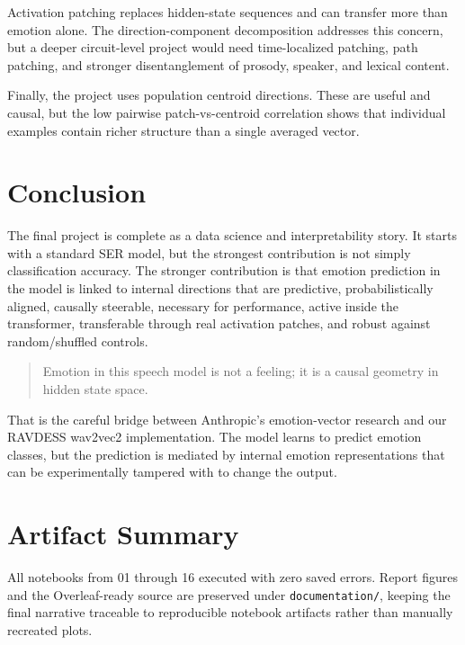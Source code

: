 \documentclass[conference]{IEEEtran}
\begin{document}
Activation patching replaces hidden-state sequences and can transfer more than emotion alone. The direction-component decomposition addresses this concern, but a deeper circuit-level project would need time-localized patching, path patching, and stronger disentanglement of prosody, speaker, and lexical content.

Finally, the project uses population centroid directions. These are useful and causal, but the low pairwise patch-vs-centroid correlation shows that individual examples contain richer structure than a single averaged vector.

\section{Conclusion}

The final project is complete as a data science and interpretability story. It starts with a standard SER model, but the strongest contribution is not simply classification accuracy. The stronger contribution is that emotion prediction in the model is linked to internal directions that are predictive, probabilistically aligned, causally steerable, necessary for performance, active inside the transformer, transferable through real activation patches, and robust against random/shuffled controls.

\begin{quote}
Emotion in this speech model is not a feeling; it is a causal geometry in hidden state space.
\end{quote}

That is the careful bridge between Anthropic's emotion-vector research and our RAVDESS wav2vec2 implementation. The model learns to predict emotion classes, but the prediction is mediated by internal emotion representations that can be experimentally tampered with to change the output.

\section*{Artifact Summary}

All notebooks from 01 through 16 executed with zero saved errors. Report figures and the Overleaf-ready source are preserved under \texttt{documentation/}, keeping the final narrative traceable to reproducible notebook artifacts rather than manually recreated plots.



\end{document}
